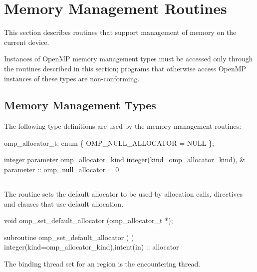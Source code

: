 \section{Memory Management Routines}
\label{sec:Memory Management Routines}
This section describes routines that support management of memory on the current device.

Instances of OpenMP memory management types must be accessed only through the routines described in this section; programs that otherwise access OpenMP instances of these types are non-conforming.

\subsection{Memory Management Types}
\label{subsec:Memory Management Types}

The following type definitions are used by the memory management routines:

\begin{ccppspecific}
\begin{codepar}
omp_allocator_t;
enum \{ OMP_NULL_ALLOCATOR = NULL \};
\end{codepar}
\end{ccppspecific}

\begin{fortranspecific}
\begin{codepar}
integer parameter omp_allocator_kind
integer(kind=omp_allocator_kind), &
        parameter :: omp_null_allocator = 0
\end{codepar}
\end{fortranspecific}

\subsection{}
\label{subsec:omp_set_default_allocator}

\summary
The  routine sets the default allocator to be used by allocation calls, directives and clauses that use default allocation.

\format
\ccppspecificstart
\begin{boxedcode}
void omp_set_default_allocator (omp_allocator_t *);
\end{boxedcode}
\ccppspecificend
\fortranspecificstart
\begin{boxedcode}
subroutine omp_set_default_allocator (  )
integer(kind=omp_allocator_kind),intent(in) :: allocator
\end{boxedcode}
\fortranspecificend
\binding
The binding thread set for an  region is the encountering thread.

